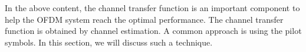 In the above content, the channel transfer function is an important component to help the OFDM system reach the optimal performance. The channel transfer function is obtained by channel estimation. A common approach is using the pilot symbols. In this section, we will discuss such a technique.

